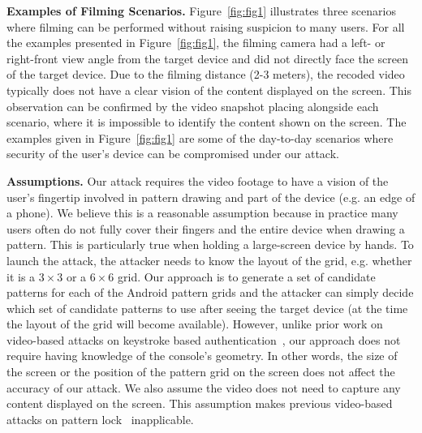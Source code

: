          \vspace{2mm}
        \noindent \textbf{Examples of Filming Scenarios.} Figure~\ref{fig:fig1} illustrates three scenarios where filming can be
        performed without raising suspicion to many users. For all the examples presented in Figure~\ref{fig:fig1}, the
        filming camera had a left- or right-front view angle from the target device and did not directly face the screen of the target device. Due to the filming distance (2-3 meters), the recoded video typically does not have a clear vision of
        the content displayed on the screen.  This observation can be confirmed by the video snapshot placing
        alongside each scenario, where it is impossible to identify the content shown on the screen.
        The examples given in Figure~\ref{fig:fig1} are some of the day-to-day
        scenarios where security of the user's device can be compromised under
        our attack.

         \vspace{2mm}
        \noindent \textbf{Assumptions.}
        Our attack requires the video footage to have a vision of the user's
        fingertip involved in pattern drawing and part of the device (e.g. an edge of a phone).
        We believe this is a reasonable assumption because in practice many users often do not fully cover their fingers and the entire device when drawing a pattern.
        This is particularly true when holding a large-screen device by hands.
        To launch the
        attack, the attacker needs to know the layout of the grid, e.g. whether it is
        a $3 \times 3$ or a $6 \times 6$ grid. Our approach is to generate a set of
        candidate patterns for each of the Android pattern grids and the attacker can simply decide
        which set of candidate patterns to use after seeing the target device (at the time the
        layout of the grid will become available). However, unlike prior work on
        video-based attacks on keystroke based authentication~\cite{shukla2014beware}, our approach does not
        require having knowledge of the console's geometry. In other words, the size
        of the screen or the position of the pattern grid  on the screen does not
        affect the accuracy of our attack. We also assume the video does not need to
        capture any content displayed on the screen. This assumption makes previous
        video-based attacks on pattern lock~\cite{aviv2010smudge} inapplicable.
